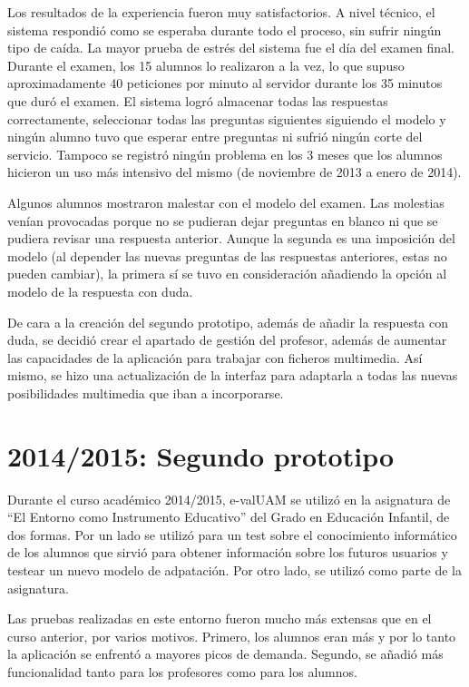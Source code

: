 Los resultados de la experiencia fueron muy satisfactorios. A nivel técnico, el sistema respondió como se esperaba durante todo el proceso, sin sufrir ningún tipo de caída. La mayor prueba de estrés del sistema fue el día del examen final. Durante el examen, los 15 alumnos lo realizaron a la vez, lo que supuso aproximadamente 40 peticiones por minuto al servidor durante los 35 minutos que duró el examen. El sistema logró almacenar todas las respuestas correctamente, seleccionar todas las preguntas siguientes siguiendo el modelo y ningún alumno tuvo que esperar entre preguntas ni sufrió ningún corte del servicio. Tampoco se registró ningún problema en los 3 meses que los alumnos hicieron un uso más intensivo del mismo (de noviembre de 2013 a enero de 2014).

Algunos alumnos mostraron malestar con el modelo del examen. Las molestias venían provocadas porque no se pudieran dejar preguntas en blanco ni que se pudiera revisar una respuesta anterior. Aunque la segunda es una imposición del modelo (al depender las nuevas preguntas de las respuestas anteriores, estas no pueden cambiar), la primera sí se tuvo en consideración añadiendo la opción al modelo de la respuesta con duda.

De cara a la creación del segundo prototipo, además de añadir la respuesta con duda, se decidió crear el apartado de gestión del profesor, además de aumentar las capacidades de la aplicación para trabajar con ficheros multimedia. Así mismo, se hizo una actualización de la interfaz para adaptarla a todas las nuevas posibilidades multimedia que iban a incorporarse.

\section{2014/2015: Segundo prototipo}

Durante el curso académico 2014/2015, \acrshort{e-valUAM} se utilizó en la asignatura de ``El Entorno como Instrumento Educativo'' del Grado en Educación Infantil, de dos formas. Por un lado se utilizó para un test sobre el conocimiento informático de los alumnos que sirvió para obtener información sobre los futuros usuarios y testear un nuevo modelo de adpatación. Por otro lado, se utilizó como parte de la asignatura.

Las pruebas realizadas en este entorno fueron mucho más extensas que en el curso anterior, por varios motivos. Primero, los alumnos eran más y por lo tanto la aplicación se enfrentó a mayores picos de demanda. Segundo, se añadió más funcionalidad tanto para los profesores como para los alumnos.

